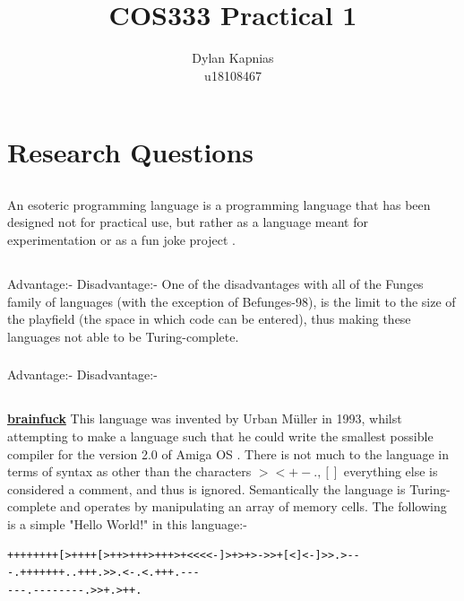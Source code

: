 \documentclass{article}
\title{COS333 Practical 1}
\author{Dylan Kapnias \\ u18108467}
\begin{document}
\maketitle

\section{Research Questions}
\subsection{}
An esoteric programming language is a programming language that has been designed not for practical use, but rather as a language meant for experimentation or as a fun joke project \cite{web:eso:def}.

\subsection{}
\subsubsection{}
Advantage:- 
\linebreak{}
\linebreak{}
Disadvantage:- One of the disadvantages with all of the Funges family of languages (with the exception of Befunges-98), is the limit to the size of the playfield (the space in which code can be entered), thus making these languages not able to be Turing-complete.

\subsubsection{}
Advantage:- 
\linebreak{}
\linebreak{}
Disadvantage:-

\subsection{}
\underline{\textbf{brainfuck}}
\linebreak{}
This language was invented by Urban Müller in 1993, whilst attempting to make a language such that he could write the smallest possible compiler for the version 2.0 of Amiga OS \cite{web:brainfuck:def}. There is not much to the language in terms of syntax as other than the characters $><+-.,[]$ everything else is considered a comment, and thus is ignored. Semantically the language is Turing-complete and operates by manipulating an array of memory cells. The following is a simple "Hello World!" in this language:-
\begin{verbatim}
++++++++[>++++[>++>+++>+++>+<<<<-]>+>+>->>+[<]<-]>>.>---.+++++++..+++.>>.<-.<.+++.---
---.--------.>>+.>++.
\end{verbatim}
\end{document}
